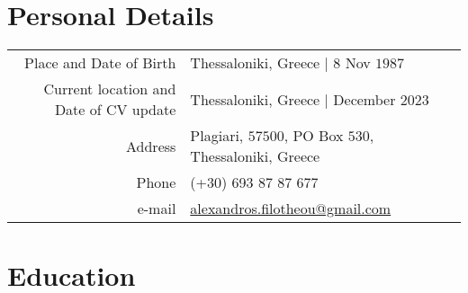 \documentclass[a4paper,10pt,twoside]{article}
\begin{document}


\par{\bigskip\par}

\section{Personal Details}

\begin{tabular}{rp{10cm}}
Place and Date of Birth 	              & Thessaloniki, Greece | $8$ Nov $1987$ \\
Current location and Date of CV update  & Thessaloniki, Greece | December 2023 \\
Address            			                & Plagiari, $57500$, PO Box $530$, Thessaloniki, Greece \\
Phone                                   & (+30) 693 87 87 677 \\
e-mail                                  & \href{mailto:alexandros.filotheou@gmail.com}{alexandros.filotheou@gmail.com}
\end{tabular}


\section{Education}
\end{document}
